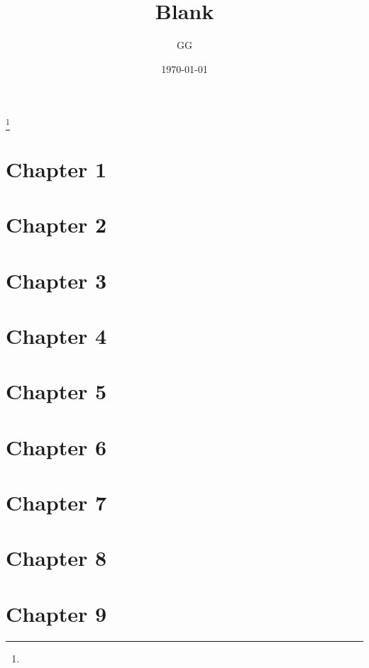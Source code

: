\documentclass[11pt]{amsart}
\theoremstyle{definition}
\begin{document}
\title[Solutions]{Blank}
\date{\today}

\author[G. E. G.]{GG}
\address{Unlisted}

\thanks{}




\maketitle

\section*{Chapter 1}



\section*{Chapter 2}



\section*{Chapter 3}



\section*{Chapter 4}



\section*{Chapter 5}



\section*{Chapter 6}



\section*{Chapter 7}



\section*{Chapter 8}



\section*{Chapter 9}



\begin{thebibliography}{99}


\end{thebibliography}
\end{document}
